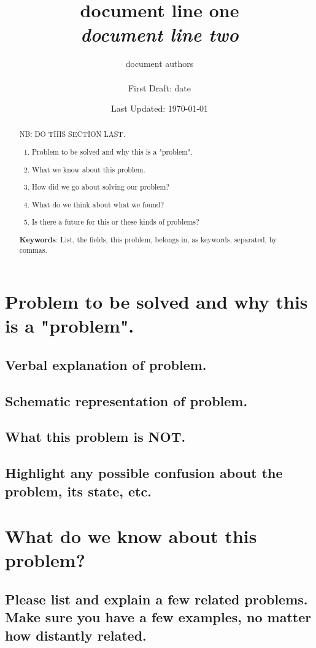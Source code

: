 \documentclass[]{report}
\title{document line one \\ \textit{document line two}}
\author{document authors \\ \\ First Draft: date}
\date{Last Updated: \today}
\begin{document}
\maketitle

\renewcommand{\abstractname}{What to expect}
\begin{abstract}
NB: DO THIS SECTION LAST.
\begin{enumerate}
\item Problem to be solved and why this is a "problem".
\item What we know about this problem. 
\item How did we go about solving our problem? 
\item What do we think about what we found?
\item Is there a future for this or these kinds of problems?
\end{enumerate}
\textbf{Keywords}: List, the fields, this problem, belongs in, as keywords, separated, by commas.
\end{abstract}

\newpage
	
\chapter{Problem to be solved and why this is a "problem".} 
\section{Verbal explanation of problem.}
\section{Schematic representation of problem.}
\section{What this problem is NOT.}
\section{Highlight any possible confusion about the problem, its state, etc.}

\chapter{What do we know about this problem?} 
\section{Please list and explain a few related problems. Make sure you have a few examples, no matter how distantly related.}
\end{document}

